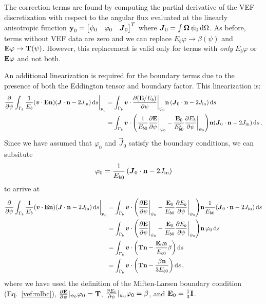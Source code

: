 \documentclass[../doc.tex]{subfiles}
\begin{document}
The correction terms are found by computing the partial derivative of the VEF discretization with respect to the angular flux evaluated at the linearly anisotropic function $\boldsymbol{\mathrm{y}}_0 = \begin{bmatrix} \psi_0 & \varphi_0 & \boldsymbol{J}_0 \end{bmatrix}^T$ where $\boldsymbol{J}_0 = \int \boldsymbol{\Omega}\,\psi_0 \mathop{}\!\mathrm{d} \Omega$. As before, terms without VEF data are zero and we can replace $E_b\varphi \rightarrow \beta(\psi)$ and $\boldsymbol{\mathrm{E}}\varphi \rightarrow \boldsymbol{\mathrm{T}}(\psi)$. However, this replacement is valid only for terms with \emph{only} $E_b\varphi$ or $\boldsymbol{\mathrm{E}}\varphi$ and not both. 

An additional linearization is required for the boundary terms due to the presence of both the Eddington tensor and boundary factor. This linearization is: 
	\begin{equation}
	\begin{aligned}
		\frac{\partial }{\partial \psi}\int_{\Gamma_b} \frac{1}{E_b}\!\left( \boldsymbol{v}\cdot\boldsymbol{\mathrm{E}}\boldsymbol{\mathrm{n}} \right)\!\left( \boldsymbol{J}\cdot\boldsymbol{\mathrm{n}} - 2J_\text{in} \right) \mathop{}\!\mathrm{d} s \biggr\rvert_{\boldsymbol{\mathrm{y}}_0} &= \int_{\Gamma_b} \boldsymbol{v}\cdot\frac{\partial (\boldsymbol{\mathrm{E}}/E_b)}{\partial \psi}\biggr\rvert_{\psi_0}\boldsymbol{\mathrm{n}}\left( \boldsymbol{J}_0\cdot\boldsymbol{\mathrm{n}} - 2J_\text{in} \right) \mathop{}\!\mathrm{d} s \\
		&= \int_{\Gamma_b} \boldsymbol{v} \cdot \left( \frac{1}{E_{b0}}\frac{\partial \boldsymbol{\mathrm{E}}}{\partial \psi}\biggr\rvert_{\psi_0} - \frac{\boldsymbol{\mathrm{E}}_0}{E_{b0}^2}\frac{\partial E_b}{\partial \psi}\biggr\rvert_{\psi_0} \right)\!\boldsymbol{\mathrm{n}}\!\left( \boldsymbol{J}_0\cdot\boldsymbol{\mathrm{n}} - 2J_\text{in} \right) \mathop{}\!\mathrm{d} s \,. 
	\end{aligned}
	\end{equation}
Since we have assumed that $\varphi_0$ and $\vec{J}_0$ satisfy the boundary conditions, we can subsitute 
	\begin{equation}
		\varphi_0 = \frac{1}{E_{b0}}\left( \boldsymbol{J}_0\cdot\boldsymbol{\mathrm{n}} - 2J_\text{in} \right) 
	\end{equation}
to arrive at 
	\begin{equation}
	\begin{aligned}
		\pderiv{}{\psi}\int_{\Gamma_b} \frac{1}{E_b}\!\paren{\vec{v}\cdot\E\n}\!\paren{\vec{J}\cdot\n - 2\Jin} \ud s \biggr\rvert_{\y_0} &= \int_{\Gamma_b} \vec{v}\cdot\paren{\pderiv{\E}{\psi}\biggr\rvert_{\psi_0} - \frac{\E_0}{E_{b0}} \pderiv{E_b}{\psi}\biggr\rvert_{\psi_0}}\!\n \frac{1}{E_{b0}}\!\paren{\vec{J}_0\cdot\n - 2\Jin} \ud s \\
		&= \int_{\Gamma_b} \vec{v}\cdot\paren{\pderiv{\E}{\psi}\biggr\rvert_{\psi_0} - \frac{\E_0}{E_{b0}} \pderiv{E_b}{\psi}\biggr\rvert_{\psi_0}}\!\n\,\varphi_0 \ud s \\
		&= \int_{\Gamma_b} \vec{v}\cdot\paren{\T\n - \frac{\E_0\n}{E_{b0}}\beta} \ud s \\
		&= \int_{\Gamma_b} \vec{v}\cdot\paren{\T\n - \frac{\beta\n}{3E_{b0}}} \ud s \,, 
	\end{aligned}
	\end{equation}
where we have used the definition of the Miften-Larsen boundary condition (Eq.~\ref{vef:mlbc}), $\frac{\partial \boldsymbol{\mathrm{E}}}{\partial \psi}\rvert_{\psi_0}\varphi_0 = \boldsymbol{\mathrm{T}}$, $\frac{\partial E_b}{\partial \psi}\rvert_{\psi_0}\varphi_0 = \beta$, and $\boldsymbol{\mathrm{E}}_0 = \frac{1}{3}\boldsymbol{\mathrm{I}}$. 
\end{document}

